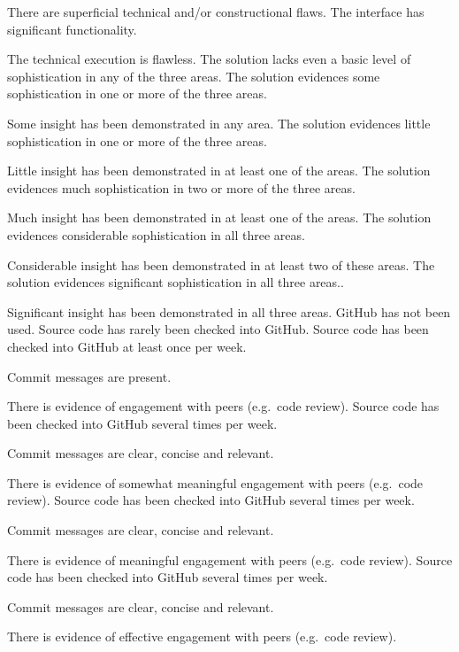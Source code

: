 \documentclass{../fal_assignment}
\begin{document}
\begin{markingrubric}
            \par There are superficial technical and/or constructional flaws.
        \grade The interface has significant functionality.
            \par The technical execution is flawless.
%
        \grade\fail The solution lacks even a basic level of sophistication in any of the three areas.
        \grade The solution evidences some sophistication in one or more of the three areas.
            \par Some insight has been demonstrated in any area.
        \grade The solution evidences little sophistication in one or more of the three areas.
            \par Little insight has been demonstrated in at least one of the areas.
        \grade The solution evidences much sophistication in two or more of the three areas.
            \par Much insight has been demonstrated in at least one of the areas.
        \grade The solution evidences considerable sophistication in all three areas.
            \par Considerable insight has been demonstrated in at least two of these areas.
        \grade The solution evidences significant sophistication in all three areas..
            \par Significant insight has been demonstrated in all three areas.
%            
        \grade\fail GitHub has not been used.
        \grade Source code has rarely been checked into GitHub.
        \grade Source code  has been checked into GitHub at least once per week.
            \par Commit messages are present.
            \par There is evidence of engagement with peers (e.g.\ code review).
        \grade Source code  has been checked into GitHub several times per week.
            \par Commit messages are clear, concise and relevant.
            \par There is evidence of somewhat meaningful engagement with peers (e.g.\ code review).
        \grade Source code has been checked into GitHub several times per week.
            \par Commit messages are clear, concise and relevant.
            \par There is evidence of meaningful engagement with peers (e.g.\ code review).
        \grade Source code has been checked into GitHub several times per week.
            \par Commit messages are clear, concise and relevant.
            \par There is evidence of effective engagement with peers (e.g.\ code review).
%
\end{markingrubric}
\end{document}
